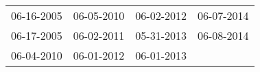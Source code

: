 \begin{supertabular}{llll}
 06-16-2005 &  06-05-2010 &  06-02-2012 &  06-07-2014 \\
 06-17-2005 &  06-02-2011 &  05-31-2013 &  06-08-2014 \\
 06-04-2010 &  06-01-2012 &  06-01-2013 &             \\
\end{supertabular}
